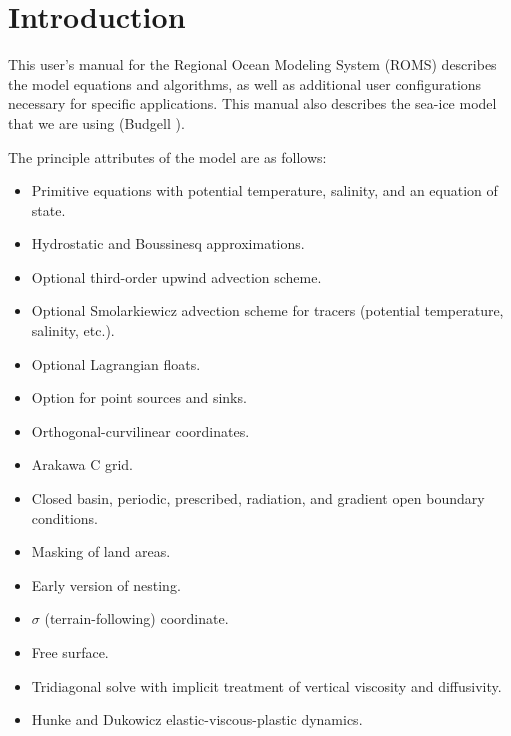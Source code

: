 \setcounter{page}{1}
\section{Introduction}
\label{Intro}
This user's manual for the Regional Ocean Modeling System (ROMS)
describes the model equations and algorithms, as well as
additional user configurations necessary for specific applications.
This manual also describes the sea-ice model
that we are using (Budgell \cite{Budgell05}).

The principle attributes of the model are as follows:
\begin{klist}
 \mbox{}
\begin{itemize}
  \item Primitive equations with potential temperature, salinity, and an
equation of state.
  \item Hydrostatic and Boussinesq approximations.
  \item Optional third-order upwind advection scheme.
  \item Optional Smolarkiewicz advection scheme for tracers
    (potential temperature, salinity, etc.).
  \item Optional Lagrangian floats.
  \item Option for point sources and sinks.
\end {itemize}
 \mbox{}
\begin{itemize}
  \item Orthogonal-curvilinear coordinates.
  \item Arakawa C grid.
  \item Closed basin, periodic, prescribed, radiation, and
    gradient open boundary conditions.
  \item Masking of land areas.
  \item Early version of nesting.
\end {itemize}
 \mbox{}
\begin{itemize}
  \item $\sigma$ (terrain-following) coordinate.
  \item Free surface.
  \item Tridiagonal solve with implicit treatment of vertical
    viscosity and diffusivity.
\end {itemize}
 \mbox{}
\begin{itemize}
  \item Hunke and Dukowicz elastic-viscous-plastic dynamics.

\end{itemize}
\end{klist}
